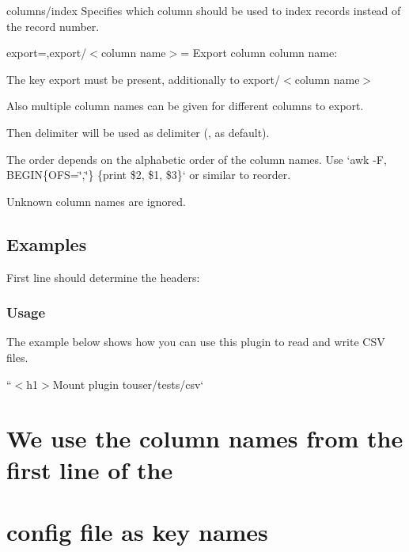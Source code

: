 {\ttfamily columns/index} Specifies which column should be used to index records instead of the record number.

{\ttfamily export=,export/$<$column name$>$=} Export column {\ttfamily column name}\+:


\begin{DoxyItemize}
\item The key {\ttfamily export} must be present, additionally to {\ttfamily export/$<$column name$>$}
\item Also multiple column names can be given for different columns to export.
\begin{DoxyItemize}
\item Then {\ttfamily delimiter} will be used as delimiter ({\ttfamily ,} as default).
\item The order depends on the alphabetic order of the column names. Use `awk -\/F\textquotesingle{},\textquotesingle{} \textquotesingle{}B\+E\+G\+IN\{O\+FS=\char`\"{},\char`\"{}\} \{print \$2, \$1, \$3\}\textquotesingle{}` or similar to reorder.
\item Unknown column names are ignored.
\end{DoxyItemize}
\end{DoxyItemize}

\subsection*{Examples}

First line should determine the headers\+: 


\subsubsection*{Usage}

The example below shows how you can use this plugin to read and write C\+SV files.

``{\ttfamily  $<$h1$>$Mount plugin to}user/tests/csv` \section*{We use the column names from the first line of the}

\section*{config file as key names}

